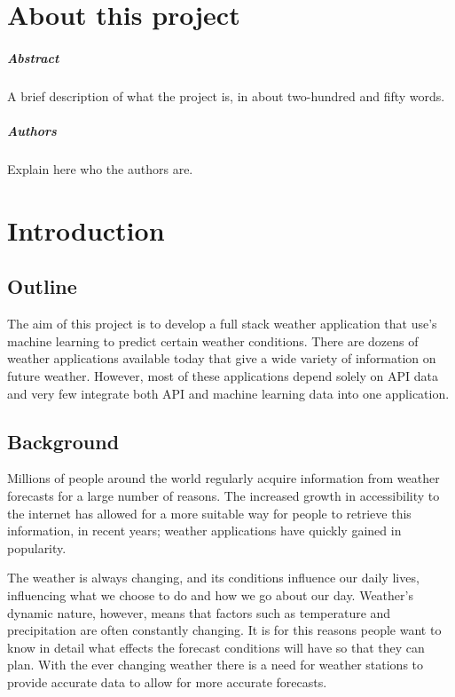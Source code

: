 
\chapter*{About this project}
\paragraph{Abstract}
A brief description of what the project is, in about two-hundred and fifty words.

\paragraph{Authors}
Explain here who the authors are.



\chapter{Introduction}

\section{Outline}
The aim of this project is to develop a full stack weather application that use's machine learning to predict certain weather conditions. There are dozens of weather applications available today that give a wide variety of information on future weather. However, most of these applications depend solely on API data and very few integrate both API and machine learning data into one application.

\section{Background}
Millions of people around the world regularly acquire information from weather forecasts for a large number of reasons. The increased growth in accessibility to the internet has allowed for a more suitable way for people to retrieve this information, in recent years; weather applications have quickly gained in popularity.

The weather is always changing, and its conditions influence our daily lives, influencing what we choose to do and how we go about our day. Weather’s dynamic nature, however, means that factors such as temperature and precipitation are often constantly changing. It is for this reasons people want to know in detail what effects the forecast conditions will have so that they can plan. \cite{WeatherontheGo} With the ever changing weather there is a need for weather stations to provide accurate data to allow for more accurate forecasts.


